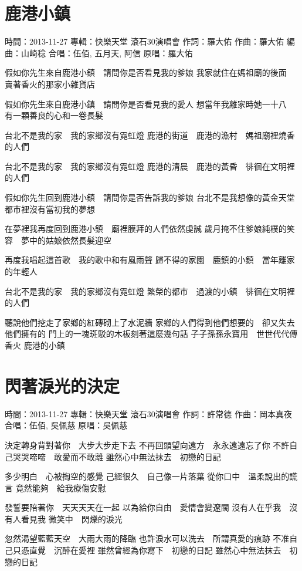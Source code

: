 \documentclass[UTF8,a4paper,oneside,twocolumn,12pt]{ctexbook}
\newcommand{\infopair}[2]{\textbullet #1：#2}
\newcommand{\zc}[1][伍佰]{\infopair{作詞}{#1}}
\newcommand{\zq}[1][伍佰]{\infopair{作曲}{#1}}
\newcommand{\bq}[1][伍佰]{\infopair{編曲}{#1}}
\newcommand{\zj}[1]{\infopair{專輯}{#1}}
\newcommand{\yc}[1]{\infopair{原唱}{#1}}
\newcommand{\sj}[1]{\infopair{時間}{#1}}
\newenvironment{info}{\begin{flushleft}\kaishu
	}
	{\end{flushleft}\normalsize\yahei\par}
\newenvironment{lyric}{
	}
{}
\begin{document}
\section{鹿港小鎮}
\begin{info}
	\sj{2013-11-27}
	\zj{快樂天堂 滾石30演唱會}
	\zc[羅大佑]
	\zq[羅大佑]
	\bq[山崎稔]
	\infopair{合唱}{伍佰, 五月天, 阿信}
	\yc{羅大佑}
\end{info}
\begin{lyric}
	假如你先生來自鹿港小鎮　請問你是否看見我的爹娘
	我家就住在媽祖廟的後面　賣著香火的那家小雜貨店

	假如你先生來自鹿港小鎮　請問你是否看見我的愛人
	想當年我離家時她一十八　有一顆善良的心和一卷長髮

	台北不是我的家　我的家鄉沒有霓虹燈
	鹿港的街道　鹿港的漁村　媽祖廟裡燒香的人們

	台北不是我的家　我的家鄉沒有霓虹燈
	鹿港的清晨　鹿港的黃昏　徘徊在文明裡的人們

	假如你先生回到鹿港小鎮　請問你是否告訴我的爹娘
	台北不是我想像的黃金天堂　都市裡沒有當初我的夢想

	在夢裡我再度回到鹿港小鎮　廟裡膜拜的人們依然虔誠
	歲月掩不住爹娘純樸的笑容　夢中的姑娘依然長髮迎空

	再度我唱起這首歌　我的歌中和有風雨聲
	歸不得的家園　鹿鎮的小鎮　當年離家的年輕人

	台北不是我的家　我的家鄉沒有霓虹燈
	繁榮的都市　過渡的小鎮　徘徊在文明裡的人們

	聽說他們挖走了家鄉的紅磚砌上了水泥牆
	家鄉的人們得到他們想要的　卻又失去他們擁有的
	門上的一塊斑駁的木板刻著這麼幾句話
	子子孫孫永寶用　世世代代傳香火
	鹿港的小鎮
\end{lyric}

\section{閃著淚光的決定}
\begin{info}
	\sj{2013-11-27}
	\zj{快樂天堂 滾石30演唱會}
	\zc[許常德]
	\zq[岡本真夜]
	\infopair{合唱}{伍佰, 吳佩慈}
	\yc{吳佩慈}
\end{info}
\begin{lyric}
	決定轉身背對著你　大步大步走下去
	不再回頭望向遠方　永永遠遠忘了你
	不許自己哭哭啼啼　敢愛而不敢離
	雖然心中無法抹去　初戀的日記

	多少明白　心被掏空的感覺
	己經很久　自己像一片落葉
	從你口中　溫柔說出的謊言
	竟然能夠　給我療傷安慰

	發誓要陪著你　天天天天在一起
	以為給你自由　愛情會變遼闊
	沒有人在乎我　沒有人看見我
	微笑中　閃爍的淚光

	忽然渴望藍藍天空　大雨大雨的降臨
	也許淚水可以洗去　所謂真愛的痕跡
	不准自己只憑直覺　沉醉在愛裡
	雖然曾經為你寫下　初戀的日記
	雖然心中無法抹去　初戀的日記
\end{lyric}
\end{document}
